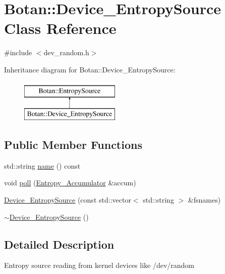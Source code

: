 \hypertarget{classBotan_1_1Device__EntropySource}{\section{Botan\-:\-:Device\-\_\-\-Entropy\-Source Class Reference}
\label{classBotan_1_1Device__EntropySource}
}


{\ttfamily \#include $<$dev\-\_\-random.\-h$>$}

Inheritance diagram for Botan\-:\-:Device\-\_\-\-Entropy\-Source\-:\begin{figure}[H]
\begin{center}
\leavevmode
\includegraphics[height=2.000000cm]{classBotan_1_1Device__EntropySource}
\end{center}
\end{figure}
\subsection*{Public Member Functions}
\begin{DoxyCompactItemize}
\item 
std\-::string \hyperlink{classBotan_1_1Device__EntropySource_a52d6e8095bb7bbe32284543b271a0204}{name} () const 
\item 
void \hyperlink{classBotan_1_1Device__EntropySource_aea1e559bf1f176bf589faa052b4a4967}{poll} (\hyperlink{classBotan_1_1Entropy__Accumulator}{Entropy\-\_\-\-Accumulator} \&accum)
\item 
\hyperlink{classBotan_1_1Device__EntropySource_ae841d972477af247e5332b68855f4457}{Device\-\_\-\-Entropy\-Source} (const std\-::vector$<$ std\-::string $>$ \&fsnames)
\item 
\hyperlink{classBotan_1_1Device__EntropySource_aa5b299286c2498607c59842b2dfa054b}{$\sim$\-Device\-\_\-\-Entropy\-Source} ()
\end{DoxyCompactItemize}


\subsection{Detailed Description}
Entropy source reading from kernel devices like /dev/random 

